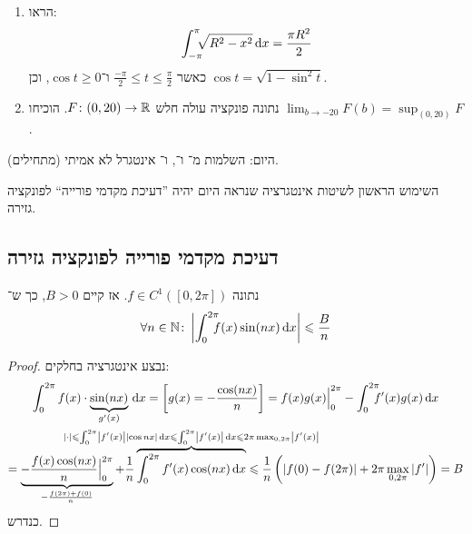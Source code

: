 \documentclass[name=רשימות חדו''א 2א]{../../../tex/classes/noChapterMegasumPreamble}
\newcommand\Is{\dequad \ }
\begin{document}
	\begin{Exercise}[פתיחה]
		\begin{enumerate}
			\item הראו:
			\[ \int_{-\pi}^{\pi}\Is \sqrt{R^{2} - x^{2}}\dx = \frac{\pi R^{2}}{2} \]
			כאשר $\frac{-\pi}{2} \le t \le \frac{\pi}{2}$ ו־$\cos t \ge0$, וכן $\cos t = \sqrt{1 - \sin^{2}t}$.

			\item נתונה פונקציה עולה חלש $F \colon (0, 20) \to \mathbb{R}$. הוכיחו $\lim_{b \to -20}F(b) = \sup_{(0, 20)}F$.
		\end{enumerate}

		היום: השלמות מ־ ו־, ו־ אינטגרל לא אמיתי (מתחילים).
	\end{Exercise}

	השימוש הראשון לשיטות אינטגרציה שנראה היום יהיה ''דעיכת מקדמי פורייה`` לפונקציה גזירה.
	\subsection{דעיכת מקדמי פורייה לפונקציה גזירה}
	נתונה $f \in C^{1}([0, 2\pi])$. אז קיים $B > 0$, כך ש־
	\[ \forall n \in \N \co \sof{\int^{2\pi}_0 \Is f(x) \sin(nx) \dx} \le \frac{B}{n}  \]
	\begin{proof}
		נבצע אינטגרציה בחלקים:
		\begin{multline*}
			\int^{2\pi}_0 f(x) \cdot \underbrace{\sin(nx)}_{g'(x)}\dx = \csb{g(x) = -\frac{\cos(nx)}{n}} = f(x)g(x)\Big\vert^{2\pi}_0 - \int^{2\pi}_0 \Is f'(x) g(x) \dx \\
			= \underbrace{-\frac{f(x) \cos(nx)}{n}\Big\vert^{2\pi}_0}_{-\frac{f(2\pi) + f(0)}{n}} + \frac{1}{n}\overbrace{\int^{2\pi}_0 f'(x) \cos(nx) \dx}^{\mathclap{\smash{\sof{\cdot}\le \int^{2\pi}_0 \sof{f'(x)} \sof{\cos nx}} \dx \le \int^{2\pi}_0 \sof{f'(x)}\dx \le 2\pi\max_{0, 2\pi} \sof{f'(x)}}} \le \frac{1}{n}\cl{\sof{f(0) - f(2\pi)} + 2\pi \max_{0, 2\pi} \sof{f'}} = B
		\end{multline*}
		כנדרש.
	\end{proof}

\end{document}
